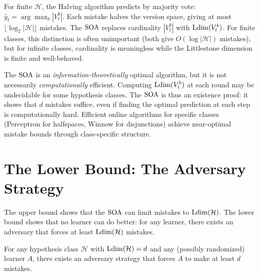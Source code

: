\begin{remark}
\label{rmk:soa-halving}
For finite $\mathcal{H}$, the Halving algorithm predicts by majority vote: $\hat{y}_t = \arg\max_b |V_t^b|$. Each mistake halves the version space, giving at most $\lfloor \log_2 |\mathcal{H}| \rfloor$ mistakes. The $\operatorname{SOA}$ replaces cardinality $|V_t^b|$ with $\mathrm{Ldim}(V_t^b)$. For finite classes, this distinction is often unimportant (both give $O(\log |\mathcal{H}|)$ mistakes), but for infinite classes, cardinality is meaningless while the Littlestone dimension is finite and well-behaved.
\end{remark}

\begin{remark}
\label{rmk:soa-computability}
The $\operatorname{SOA}$ is an \emph{information-theoretically} optimal algorithm, but it is not necessarily \emph{computationally} efficient. Computing $\mathrm{Ldim}(V_t^b)$ at each round may be undecidable for some hypothesis classes. The $\operatorname{SOA}$ is thus an existence proof: it shows that $d$ mistakes suffice, even if finding the optimal prediction at each step is computationally hard. Efficient online algorithms for specific classes (Perceptron for halfspaces, Winnow for disjunctions) achieve near-optimal mistake bounds through class-specific structure.
\end{remark}


\section{The Lower Bound: The Adversary Strategy}
\label{sec:lower-bound}

The upper bound shows that the $\operatorname{SOA}$ can limit mistakes to $\mathrm{Ldim}(\mathcal{H})$. The lower bound shows that no learner can do better: for any learner, there exists an adversary that forces at least $\mathrm{Ldim}(\mathcal{H})$ mistakes.

\begin{thm}
\label{thm:lower-bound}
  \leanok
For any hypothesis class $\mathcal{H}$ with $\mathrm{Ldim}(\mathcal{H}) = d$ and any (possibly randomized) learner $A$, there exists an adversary strategy that forces $A$ to make at least $d$ mistakes.
\end{thm}

